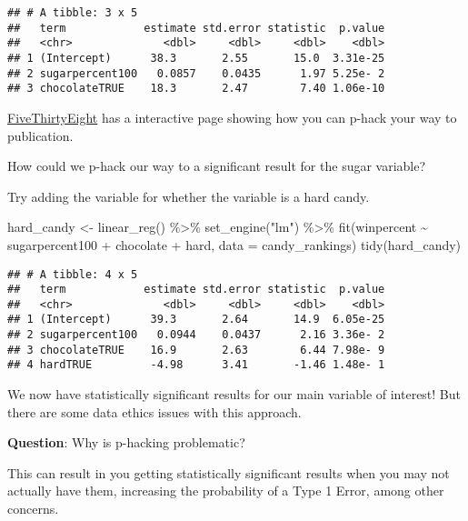 \documentclass[
]{article}
\newenvironment{Shaded}{\begin{snugshade}}{\end{snugshade}}
\newcommand{\AttributeTok}[1]{\textcolor[rgb]{0.77,0.63,0.00}{#1}}
\newcommand{\FunctionTok}[1]{\textcolor[rgb]{0.00,0.00,0.00}{#1}}
\newcommand{\NormalTok}[1]{#1}
\newcommand{\OtherTok}[1]{\textcolor[rgb]{0.56,0.35,0.01}{#1}}
\newcommand{\SpecialCharTok}[1]{\textcolor[rgb]{0.00,0.00,0.00}{#1}}
\newcommand{\StringTok}[1]{\textcolor[rgb]{0.31,0.60,0.02}{#1}}
\begin{document}
\begin{verbatim}
## # A tibble: 3 x 5
##   term            estimate std.error statistic  p.value
##   <chr>              <dbl>     <dbl>     <dbl>    <dbl>
## 1 (Intercept)      38.3       2.55       15.0  3.31e-25
## 2 sugarpercent100   0.0857    0.0435      1.97 5.25e- 2
## 3 chocolateTRUE    18.3       2.47        7.40 1.06e-10
\end{verbatim}

\href{https://projects.fivethirtyeight.com/p-hacking}{FiveThirtyEight}
has a interactive page showing how you can p-hack your way to
publication.

How could we p-hack our way to a significant result for the sugar
variable?

Try adding the variable for whether the variable is a hard candy.

\begin{Shaded}
\begin{Highlighting}[]
\NormalTok{hard\_candy }\OtherTok{\textless{}{-}} \FunctionTok{linear\_reg}\NormalTok{() }\SpecialCharTok{\%\textgreater{}\%} 
  \FunctionTok{set\_engine}\NormalTok{(}\StringTok{"lm"}\NormalTok{) }\SpecialCharTok{\%\textgreater{}\%} 
  \FunctionTok{fit}\NormalTok{(winpercent }\SpecialCharTok{\textasciitilde{}}\NormalTok{ sugarpercent100 }\SpecialCharTok{+}\NormalTok{ chocolate }\SpecialCharTok{+}\NormalTok{ hard, }\AttributeTok{data =}\NormalTok{ candy\_rankings)}
\FunctionTok{tidy}\NormalTok{(hard\_candy)}
\end{Highlighting}
\end{Shaded}

\begin{verbatim}
## # A tibble: 4 x 5
##   term            estimate std.error statistic  p.value
##   <chr>              <dbl>     <dbl>     <dbl>    <dbl>
## 1 (Intercept)      39.3       2.64       14.9  6.05e-25
## 2 sugarpercent100   0.0944    0.0437      2.16 3.36e- 2
## 3 chocolateTRUE    16.9       2.63        6.44 7.98e- 9
## 4 hardTRUE         -4.98      3.41       -1.46 1.48e- 1
\end{verbatim}

We now have statistically significant results for our main variable of
interest! But there are some data ethics issues with this approach.

\textbf{Question}: Why is p-hacking problematic?

This can result in you getting statistically significant results when
you may not actually have them, increasing the probability of a Type 1
Error, among other concerns.
\end{document}
